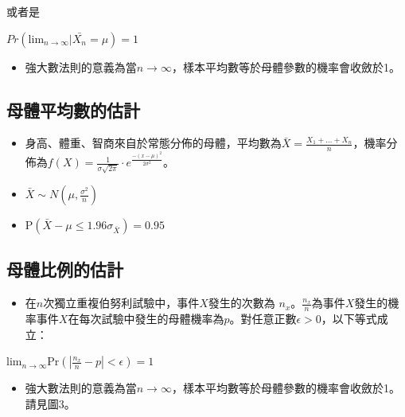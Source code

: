 \documentclass[hyperref,]{ctexart}
\providecommand{\tightlist}{%
  \setlength{\itemsep}{0pt}\setlength{\parskip}{0pt}}
\begin{document}
或者是

\begin{center}
$Pr({\mathrm {lim}}_{n\rightarrow \infty}|\bar{X_{n}}=\mu)=1$\\
\end{center}

\begin{itemize}
\tightlist
\item
  強大數法則的意義為當\(n\rightarrow \infty\)，樣本平均數等於母體參數的機率會收斂於1。
\end{itemize}

\hypertarget{ux6bcdux9ad4ux5e73ux5747ux6578ux7684ux4f30ux8a08}{%
\subsection{母體平均數的估計}\label{ux6bcdux9ad4ux5e73ux5747ux6578ux7684ux4f30ux8a08}}

\begin{itemize}
\tightlist
\item
  身高、體重、智商來自於常態分佈的母體，平均數為\(\bar{X}=\frac{X_{1}+\ldots+X_{n}}{n}\)，機率分佈為\(f(X)=\frac{1}{\sigma\sqrt{2\pi}}\cdot e^{\frac{-(x-\mu)^2}{2\sigma^2}}\)。
\item
  \(\bar{X}\sim N(\mu, \frac{\sigma^2}{n})\)
\item
  \(\text{P}(\bar{X}-\mu \leq 1.96\sigma_{\bar{X}})=0.95\)
\end{itemize}

\hypertarget{ux6bcdux9ad4ux6bd4ux4f8bux7684ux4f30ux8a08}{%
\subsection{母體比例的估計}\label{ux6bcdux9ad4ux6bd4ux4f8bux7684ux4f30ux8a08}}

\begin{itemize}
\tightlist
\item
  在\(n\)次獨立重複伯努利試驗中，事件\(X\)發生的次數為
  \(n_{x}\)。\(\frac{n_{x}}{n}\)為事件\(X\)發生的機率事件\(X\)在每次試驗中發生的母體機率為\(p\)。對任意正數\(\epsilon>0\)，以下等式成立：
\end{itemize}

\begin{center}
${\mathrm {lim}}_{n\rightarrow \infty}\text{Pr}(|\frac{n_{x}}{n}-p|< \epsilon)=1$
\end{center}

\begin{itemize}
\tightlist
\item
  強大數法則的意義為當\(n\rightarrow \infty\)，樣本平均數等於母體參數的機率會收斂於1。請見圖3。
\end{itemize}
\end{document}

